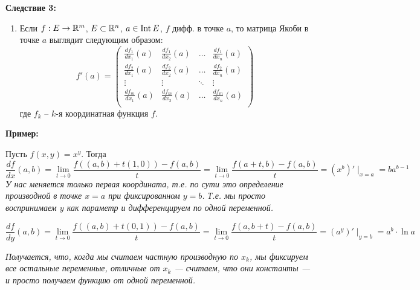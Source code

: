 \textbf{Следствие 3:}
\begin{enumerate}
    \item[] 
    Если $f : E \to \mathbb{R}^m$, $E \subset \mathbb{R}^n$, $a \in \operatorname{Int} E$,
    $f$ дифф. в точке $a$, то матрица Якоби в точке $a$
    выглядит следующим образом:
    $$ f'(a) =
    \begin{pmatrix*}
        \frac{df_1}{dx_1}(a) & \frac{df_1}{dx_2}(a) &
        \dots & \frac{df_1}{dx_n}(a) \\
        \frac{df_2}{dx_1}(a) & \frac{df_2}{dx_2}(a) &
        \dots & \frac{df_2}{dx_n}(a) \\
        \vdots & \vdots & \ddots & \vdots \\
        \frac{df_m}{dx_1}(a) & \frac{df_m}{dx_2}(a) &
        \dots & \frac{df_m}{dx_n}(a) \\
    \end{pmatrix*}$$
    где $f_k$ -- $k$-я координатная функция $f$.
\end{enumerate}

\textbf{Пример:}

Пусть $f(x, y) = x^y$. Тогда
$$
\frac{df}{dx}(a, b) = 
\lim_{t \to 0} \frac{f((a, b) + t(1, 0)) - f(a, b)}{t} =
\lim_{t \to 0} \frac{f(a + t, b) - f(a, b)}{t} =
(x^b)' \mid_{x = a} = b a^{b-1}
$$
\textit{У нас меняется только первая координата,
т.е. по сути это определение производной в точке $x = a$ при
фиксированном $y = b$. Т.е. мы просто воспринимаем $y$ как параметр
и дифференцируем по одной переменной.}

$$
\frac{df}{dy}(a, b) = 
\lim_{t \to 0} \frac{f((a, b) + t(0, 1)) - f(a, b)}{t} =
\lim_{t \to 0} \frac{f(a, b + t) - f(a, b)}{t} =
(a^y)' \mid_{y = b} = a^b \cdot \ln a
$$

\textit{Получается, что, когда мы считаем частную производную по $x_k$,
мы фиксируем все остальные переменные, отличные от $x_k$ ---
считаем, что они константы ---
и просто получаем функцию от одной переменной.}

